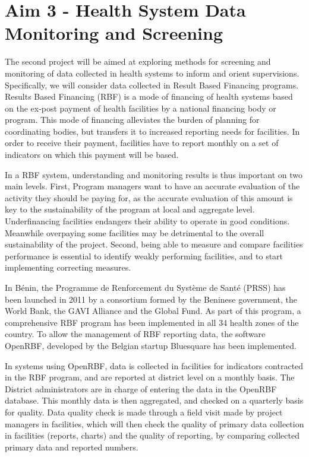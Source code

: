 \section*[Data Monitoring]{Aim 3 - Health System Data Monitoring and Screening}

The second project will be aimed at exploring methods for screening and monitoring of data collected in health systems to inform and orient supervisions. Specifically, we will consider data collected in Result Based Financing programs. Results Based Financing (RBF) is a mode of financing of health systems based on the ex-post payment of health facilities by a national financing body or program. This mode of financing alleviates the burden of planning for coordinating bodies, but transfers it to increased reporting needs for facilities. In order to receive their payment, facilities have to report monthly on a set of indicators on which this payment will be based.

In a RBF system, understanding and monitoring results is thus important on two main levels. First, Program managers want to have an accurate evaluation of the activity they should be paying for, as the accurate evaluation of this amount is key to the sustainability of the program at local and aggregate level. Underfinancing facilities endangers their ability to operate in good conditions. Meanwhile overpaying some facilities may be detrimental to the overall sustainability of the project. Second, being able to measure and compare facilities performance is essential to identify weakly performing facilities, and to start implementing correcting measures.

In Bénin, the Programme de Renforcement du Système de Santé (PRSS) has been launched in 2011 by a consortium formed by the Beninese government, the World Bank, the GAVI Alliance and the Global Fund. As part of this program, a comprehensive RBF program has been implemented in all 34 health zones of the country. To allow the management of RBF reporting data, the software OpenRBF, developed by the Belgian startup Bluesquare has been implemented.

In systems using OpenRBF, data is collected in facilities for indicators contracted in the RBF program, and are reported at district level on a monthly basis. The District administrators are in charge of entering the data in the OpenRBF database. This monthly data is then aggregated, and checked on a quarterly basis for quality. Data quality check is made through a field visit made by project managers in facilities, which will then check the quality of primary data collection in facilities (reports, charts) and the quality of reporting, by comparing collected primary data and reported numbers.

